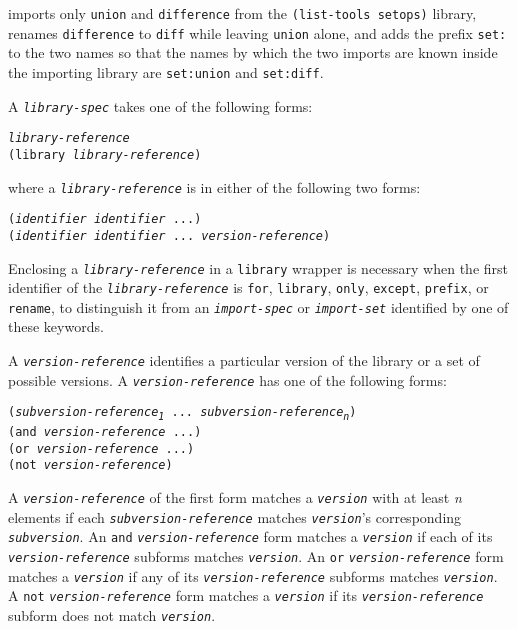 imports only \texttt{union} and \texttt{difference} from the
\texttt{(list-tools setops)} library, renames \texttt{difference} to
\texttt{diff} while leaving \texttt{union} alone, and adds the prefix
\texttt{set:} to the two names so that the names by which the two
imports are known inside the importing library are
\texttt{set:union} and \texttt{set:diff}.


A \texttt{\textit{library-spec}} takes one of the following forms:


\begin{alltt}
\textit{library-reference}
(library \textit{library-reference})
\end{alltt}


where a \texttt{\textit{library-reference}} is in either of the following two forms:


\begin{alltt}
(\textit{identifier} \textit{identifier} ...)
(\textit{identifier} \textit{identifier} ... \textit{version-reference})
\end{alltt}


Enclosing a \texttt{\textit{library-reference}} in a \texttt{library} wrapper is necessary
when the first identifier of the \texttt{\textit{library-reference}} is
\texttt{for}, \texttt{library}, \texttt{only}, \texttt{except}, \texttt{prefix}, or
\texttt{rename}, to distinguish it from an \texttt{\textit{import-spec}} or \texttt{\textit{import-set}}
identified by one of these keywords.


\label{libraries_s13}A \texttt{\textit{version-reference}} identifies a particular version of the library or
a set of possible versions.
A \texttt{\textit{version-reference}} has one of the following forms:


\begin{alltt}
(\textit{subversion-reference\textsubscript{1}} ... \textit{subversion-reference\textsubscript{n}})
(and \textit{version-reference} ...)
(or \textit{version-reference} ...)
(not \textit{version-reference})
\end{alltt}


A \texttt{\textit{version-reference}} of the first form matches a \texttt{\textit{version}} with
at least \textit{n} elements if each \texttt{\textit{subversion-reference}} matches
\texttt{\textit{version}}'s corresponding \texttt{\textit{subversion}}.
An \texttt{and} \texttt{\textit{version-reference}} form matches a \texttt{\textit{version}} if
each of its \texttt{\textit{version-reference}} subforms matches \texttt{\textit{version}}.
An \texttt{or} \texttt{\textit{version-reference}} form matches a \texttt{\textit{version}} if
any of its \texttt{\textit{version-reference}} subforms matches \texttt{\textit{version}}.
A \texttt{not} \texttt{\textit{version-reference}} form matches a \texttt{\textit{version}} if
its \texttt{\textit{version-reference}} subform does not match \texttt{\textit{version}}.


